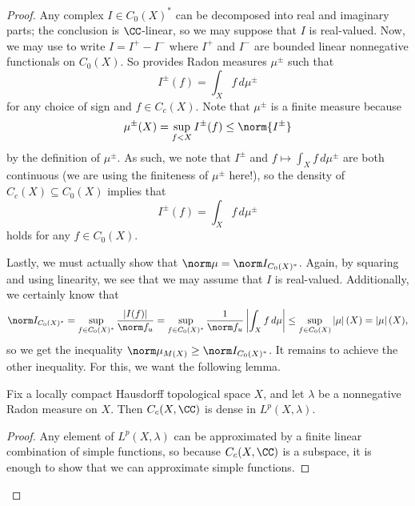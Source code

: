 \documentclass[../notes.tex]{subfiles}
\begin{document}
\begin{proof}
	Any complex $I\in C_0(X)^*$ can be decomposed into real and imaginary parts; the conclusion is $\CC$-linear, so we may suppose that $I$ is real-valued. Now, we may use  to write $I=I^+-I^-$ where $I^+$ and $I^-$ are bounded linear nonnegative functionals on $C_0(X)$. So  provides Radon measures $\mu^\pm$ such that
	\[I^\pm(f)=\int_Xf\,d\mu^\pm\]
	for any choice of sign and $f\in C_c(X)$. Note that $\mu^\pm$ is a finite measure because
	\[\mu^\pm(X)=\sup_{f<X}I^\pm(f)\le\norm{I^\pm}\]
	by the definition of $\mu^\pm$. As such, we note that $I^\pm$ and $f\mapsto\int_Xf\,d\mu^\pm$ are both continuous (we are using the finiteness of $\mu^\pm$ here!), so the density of $C_c(X)\subseteq C_0(X)$ implies that
	\[I^\pm(f)=\int_Xf\,d\mu^\pm\]
	holds for any $f\in C_0(X)$.

	Lastly, we must actually show that $\norm\mu=\norm I_{C_0(X)^*}$. Again, by squaring and using linearity, we see that we may assume that $I$ is real-valued. Additionally, we certainly know that
	\[\norm I_{C_0(X)^*}=\sup_{f\in C_0(X)^*}\frac{\left|I(f)\right|}{\norm f_u}=\sup_{f\in C_0(X)^*}\frac1{\norm f_u}\left|\int_Xf\,d\mu\right|\le\sup_{f\in C_0(X)}\left|\mu\right|(X)=\left|\mu\right|(X),\]
	so we get the inequality $\norm\mu_{M(X)}\ge\norm I_{C_0(X)^*}$. It remains to achieve the other inequality. For this, we want the following lemma.
	\begin{lemma} \label{lem:cc-dense-lp}
		Fix a locally compact Hausdorff topological space $X$, and let $\lambda$ be a nonnegative Radon measure on $X$. Then $C_c(X,\CC)$ is dense in $L^p(X,\lambda)$.
	\end{lemma}
	\begin{proof}
		Any element of $L^p(X,\lambda)$ can be approximated by a finite linear combination of simple functions, so because $C_c(X,\CC)$ is a subspace, it is enough to show that we can approximate simple functions.
		

\end{proof}
\end{proof}
\end{document}
